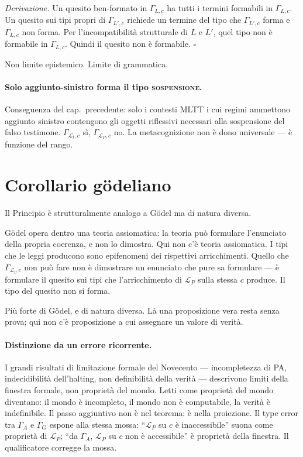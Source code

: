 \documentclass[
    oneside,                 %
    openany,                 %
    titlepage,
    11pt,
    a4paper,
    italian,
    DIV=14,                  %
    headinclude,
    footinclude=true,
    cleardoublepage=empty
]{scrbook}
\theoremstyle{ctplain}
\theoremstyle{ctdef}
\theoremstyle{ctrem}
\newcommand{\Lt}{\mathcal{L}_t}
\newcommand{\LP}{\mathcal{L}_P}
\newcommand{\GammaA}{\Gamma_A}
\newcommand{\GammaG}{\Gamma_G}
\begin{document}
\emph{Derivazione.} Un quesito ben-formato in $\Gamma_{L,c}$ ha tutti i termini formabili in $\Gamma_{L,c}$. Un quesito sui tipi propri di $\Gamma_{L',c}$ richiede un termine del tipo che $\Gamma_{L',c}$ forma e $\Gamma_{L,c}$ non forma. Per l'incompatibilità strutturale di $L$ e $L'$, quel tipo non è formabile in $\Gamma_{L,c}$. Quindi il quesito non è formabile. $\square$

Non limite epistemico. Limite di grammatica.

\paragraph{Solo aggiunto-sinistro forma il tipo \textsc{sospensione}.} Conseguenza del cap.~precedente: solo i contesti MLTT i cui regimi ammettono aggiunto sinistro contengono gli oggetti riflessivi necessari alla sospensione del falso testimone. $\Gamma_{\Lt,c}$ sì, $\Gamma_{\LP,c}$ no. La metacognizione non è dono universale --- è funzione del rango.

\section*{Corollario gödeliano}

Il Principio è strutturalmente analogo a Gödel ma di natura diversa.

Gödel opera dentro una teoria assiomatica: la teoria può formulare l'enunciato della propria coerenza, e non lo dimostra. Qui non c'è teoria assiomatica. I tipi che le leggi producono sono epifenomeni dei rispettivi arricchimenti. Quello che $\Gamma_{\Lt,c}$ non può fare non è dimostrare un enunciato che pure sa formulare --- è formulare il quesito sui tipi che l'arricchimento di $\LP$ sulla stessa $c$ produce. Il tipo del quesito non si forma.

Più forte di Gödel, e di natura diversa. Là una proposizione vera resta senza prova; qui non c'è proposizione a cui assegnare un valore di verità.

\paragraph{Distinzione da un errore ricorrente.} I grandi risultati di limitazione formale del Novecento --- incompletezza di PA, indecidibilità dell'halting, non definibilità della verità --- descrivono limiti della finestra formale, non proprietà del mondo. Letti come proprietà del mondo diventano: il mondo è incompleto, il mondo non è computabile, la verità è indefinibile. Il passo aggiuntivo non è nel teorema: è nella proiezione. Il type error tra $\GammaA$ e $\GammaG$ espone alla stessa mossa: ``$\LP$ su $c$ è inaccessibile'' suona come proprietà di $\LP$; ``da $\GammaA$, $\LP$ su $c$ non è accessibile'' è proprietà della finestra. Il qualificatore corregge la mossa.
\end{document}

